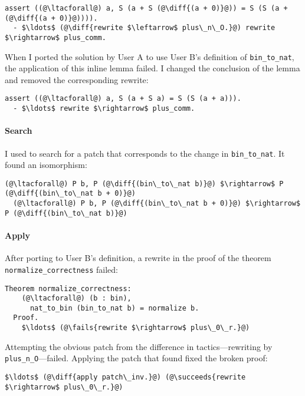 \begin{lstlisting}[language=coq]
  assert ((@\ltacforall@) a, S (a + S (@\diff{(a + 0)}@)) = S (S (a + (@\diff{(a + 0)}@)))).
  - $\ldots$ (@\diff{rewrite $\leftarrow$ plus\_n\_O.}@) rewrite $\rightarrow$ plus_comm.
\end{lstlisting} %
When I ported the solution by User A to use User B's definition of \lstinline{bin_to_nat}, 
the application of this inline lemma failed. I changed the conclusion of the lemma 
and removed the corresponding rewrite:

\begin{lstlisting}[language=coq]
  assert ((@\ltacforall@) a, S (a + S a) = S (S (a + a))).
  - $\ldots$ rewrite $\rightarrow$ plus_comm.
\end{lstlisting} %

\paragraph{Search} I used \sysname to search for a patch that corresponds to the change in \lstinline{bin_to_nat}.
It found an isomorphism:

\begin{lstlisting}[language=coq]
  (@\ltacforall@) P b, P (@\diff{(bin\_to\_nat b)}@) $\rightarrow$ P (@\diff{(bin\_to\_nat b + 0)}@)
  (@\ltacforall@) P b, P (@\diff{(bin\_to\_nat b + 0)}@) $\rightarrow$ P (@\diff{(bin\_to\_nat b)}@)
\end{lstlisting}

\paragraph{Apply} After porting to User B's definition, a rewrite in the proof of the theorem
\lstinline{normalize_correctness} failed:

\begin{lstlisting}[language=coq]
  Theorem normalize_correctness:
    (@\ltacforall@) (b : bin),
      nat_to_bin (bin_to_nat b) = normalize b.
  Proof.
    $\ldots$ (@\fails{rewrite $\rightarrow$ plus\_0\_r.}@)
\end{lstlisting}
Attempting the obvious patch from the difference in tactics---rewriting by \lstinline{plus_n_O}---failed.
Applying the patch that \sysname found fixed the broken proof:

\begin{lstlisting}[language=coq]
   $\ldots$ (@\diff{apply patch\_inv.}@) (@\succeeds{rewrite $\rightarrow$ plus\_0\_r.}@)
\end{lstlisting}

